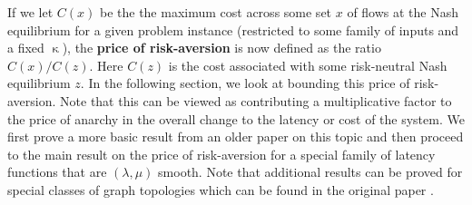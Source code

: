 If we let $C(x)$ be the the maximum cost across some set $x$ of flows at the Nash equilibrium for a given problem instance 
(restricted to some family of inputs and a fixed $\upkappa$), the {\textbf{price of risk-aversion}} is now defined as the
ratio $C(x)/C(z)$. Here $C(z)$ is the cost associated with some risk-neutral Nash equilibrium $z$. 
In the following section, we look at bounding this price of risk-aversion. Note that this can be viewed as contributing a 
multiplicative factor to the price of anarchy in the overall change to the latency or cost of the system. We first prove a 
more basic result from an older paper on this topic \cite{risk-averse-background} and then proceed to the main result on the price
of risk-aversion for 
a special family of latency functions that are $(\lambda, \mu)$ smooth. Note that additional results can be proved for special classes
of graph topologies which can be found in the original paper \cite{risk-averse}.




